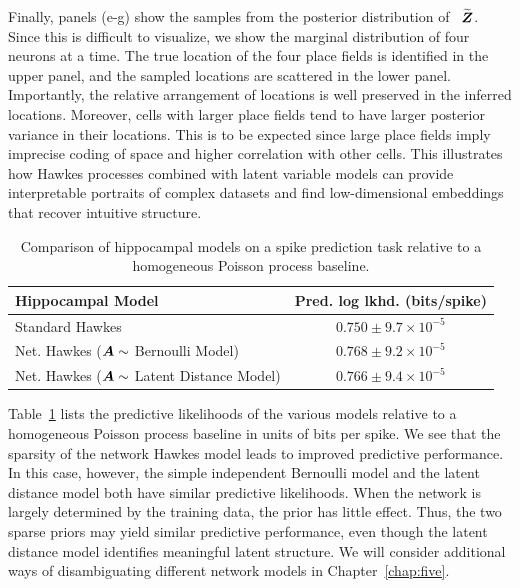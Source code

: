 Finally, panels (e-g) show the samples from the posterior distribution
of ~$\widetilde{\boldsymbol{Z}}$. Since this is difficult to visualize, we show
the marginal distribution of four neurons at a time. The true location
of the four place fields is identified in the upper panel, and the sampled
locations are scattered in the lower panel. Importantly, the relative
arrangement of locations is well preserved in the inferred locations.
Moreover, cells with larger place fields tend to have larger posterior
variance in their locations. This is to be expected since large place
fields imply imprecise coding of space and higher correlation with
other cells.  This illustrates how Hawkes processes combined with
latent variable models can provide interpretable portraits of complex
datasets and find low-dimensional embeddings that recover intuitive
structure.

\begin{table}
  \begin{center}
    \begin{tabular}{l|c}
      \textbf{Hippocampal Model} & \textbf{Pred. log lkhd. (bits/spike)} \\
      \hline
      Standard Hawkes & $0.750 \pm 9.7 \times 10^{-5}$ \\
      Net. Hawkes ($\boldsymbol{A} \sim $ Bernoulli Model) & $0.768 \pm 9.2 \times 10^{-5}$ \\
      Net. Hawkes ($\boldsymbol{A} \sim $ Latent Distance Model) & $0.766 \pm 9.4\times 10^{-5}$ \\
    \end{tabular}
  \end{center}
    \caption{Comparison of hippocampal models on a spike prediction task relative to a homogeneous Poisson process baseline.}
    \label{tab:hipp_pred_ll}
\end{table}

Table~\ref{tab:hipp_pred_ll} lists the predictive likelihoods of the
various models relative to a homogeneous Poisson process baseline in
units of bits per spike. We see that the sparsity of the network Hawkes
model leads to improved predictive performance. In this case, however,
the simple independent Bernoulli model and the latent distance model
both have similar predictive likelihoods. When the network is largely
determined by the training data, the prior has little effect. Thus,
the two sparse priors may yield similar predictive performance, even though
the latent distance model identifies meaningful latent structure.
We will consider additional ways of disambiguating different network
models in Chapter~\ref{chap:five}.


